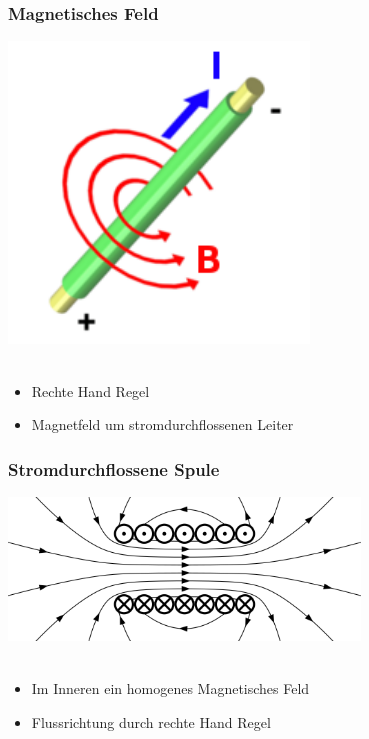 \begin{frame}
    \frametitle{Magnetisches Feld}
    \begin{center}
		\includegraphics[width=0.6\textwidth]{a08/RechteHand.png}\\
		\tiny \hyperlink{refs}{\cite{wm}} \\[1em] \large
		\begin{itemize}
			\item Rechte Hand Regel
			\item Magnetfeld um stromdurchflossenen Leiter
		\end{itemize}
	\end{center}
\end{frame}

\begin{frame}
    \frametitle{Stromdurchflossene Spule}
    \begin{center}
		\includegraphics[width=0.7\textwidth]{a08/H-Feld.png}\\
		\tiny \hyperlink{refs}{\cite{wm}} \\[1em] \large
		\begin{itemize}
		\item Im Inneren ein homogenes Magnetisches Feld
		\item Flussrichtung durch rechte Hand Regel
		\end{itemize}
	\end{center}
\end{frame}

